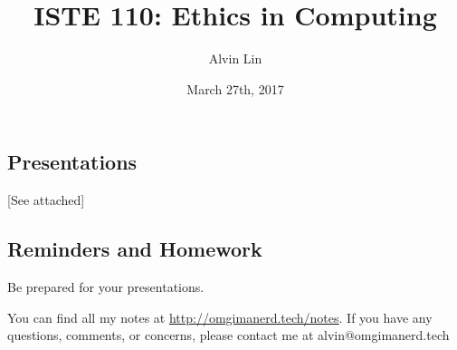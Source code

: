 \documentclass{article}
\title{ISTE 110: Ethics in Computing}
\author{Alvin Lin}
\date{March 27th, 2017}
\begin{document}
\maketitle

\subsection*{Presentations}
[See attached]

\subsection*{Reminders and Homework}
Be prepared for your presentations.

\begin{center}
  You can find all my notes at \url{http://omgimanerd.tech/notes}. If you have
  any questions, comments, or concerns, please contact me at
  alvin@omgimanerd.tech
\end{center}
\end{document}
